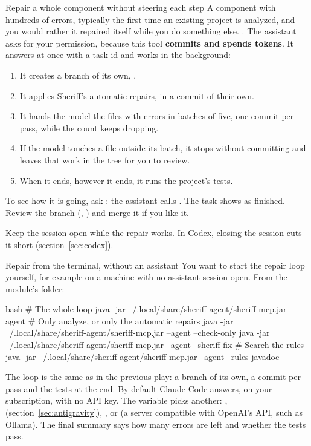 \documentclass[11pt,a4paper]{article}
\begin{document}
\begin{play}{Repair a whole component without steering each step}
\when A component with hundreds of errors, typically the first time an existing
project is analyzed, and you would rather it repaired itself while you do
something else.
\asks {}.
\happens The assistant asks for your permission, because this tool
\textbf{commits and spends tokens}. It answers at once with a task id and works
in the background:
\begin{enumerate}
  \item It creates a branch of its own, .
  \item It applies Sheriff's automatic repairs, in a commit of their own.
  \item It hands the model the files with errors in batches of five, one commit
        per pass, while the count keeps dropping.
  \item If the model touches a file outside its batch, it stops without
        committing and leaves that work in the tree for you to review.
  \item When it ends, however it ends, it runs the project's tests.
\end{enumerate}
To see how it is going, ask : the assistant calls
.
\done The task shows as finished. Review the branch (,
) and merge it if you like it.
\end{play}

\begin{warning}
Keep the session open while the repair works. In Codex, closing the session
cuts it short (section~\ref{sec:codex}).
\end{warning}

\begin{play}{Repair from the terminal, without an assistant}
\when You want to start the repair loop yourself, for example on a machine
with no assistant session open.
\asks From the module's folder:
\begin{command}[basicstyle=\ttfamily\footnotesize]{bash}
# The whole loop
java -jar ~/.local/share/sheriff-agent/sheriff-mcp.jar --agent
# Only analyze, or only the automatic repairs
java -jar ~/.local/share/sheriff-agent/sheriff-mcp.jar --agent --check-only
java -jar ~/.local/share/sheriff-agent/sheriff-mcp.jar --agent --sheriff-fix
# Search the rules
java -jar ~/.local/share/sheriff-agent/sheriff-mcp.jar --agent --rules javadoc
\end{command}
\happens The loop is the same as in the previous play: a branch of its own, a
commit per pass and the tests at the end. By default Claude Code answers, on
your subscription, with no API key. The  variable picks
another: ,  (section~\ref{sec:antigravity}), ,
 or  (a server compatible with OpenAI's API, such
as Ollama).
\done The final summary says how many errors are left and whether the tests
pass.
\end{play}
\end{document}
